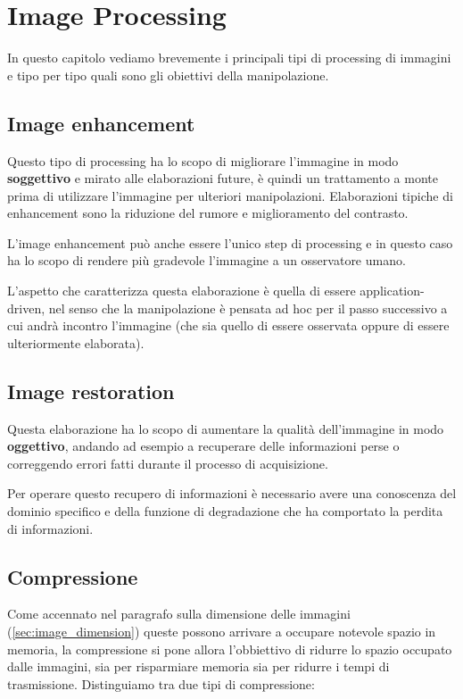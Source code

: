 \chapter{Image Processing}
In questo capitolo vediamo brevemente i principali tipi di processing di immagini e tipo per tipo quali sono gli obiettivi della manipolazione.

\section{Image enhancement}
Questo tipo di processing ha lo scopo di migliorare l'immagine in modo \textbf{soggettivo} e mirato alle elaborazioni future, è quindi un trattamento a monte prima di utilizzare l'immagine per ulteriori manipolazioni. Elaborazioni tipiche di enhancement sono la riduzione del rumore e miglioramento del contrasto. 

L'image enhancement può anche essere l'unico step di processing e in questo caso ha lo scopo di rendere più gradevole l'immagine a un osservatore umano.

L'aspetto che caratterizza questa elaborazione è quella di essere application-driven, nel senso che la manipolazione è pensata ad hoc per il passo successivo a cui andrà incontro l'immagine (che sia quello di essere osservata oppure di essere ulteriormente elaborata).

\section{Image restoration}
Questa elaborazione ha lo scopo di aumentare la qualità dell'immagine in modo \textbf{oggettivo}, andando ad esempio a recuperare delle informazioni perse o correggendo errori fatti durante il processo di acquisizione. 

Per operare questo recupero di informazioni è necessario avere una conoscenza del dominio specifico e della funzione di degradazione che ha comportato la perdita di informazioni.

\section{Compressione}
Come accennato nel paragrafo sulla dimensione delle immagini (\ref{sec:image_dimension}) queste possono arrivare a occupare notevole spazio in memoria, la compressione si pone allora l'obbiettivo di ridurre lo spazio occupato dalle immagini, sia per risparmiare memoria sia per ridurre i tempi di trasmissione. Distinguiamo tra due tipi di compressione:
